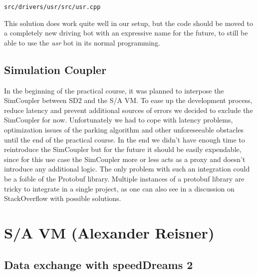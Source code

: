 \documentclass[paper=a4, fontsize=11pt]{scrreprt}
\begin{document}
\begin{listing}[ht]
  \inputminted[firstline=751,linenos=true,lastline=755,gobble=4]{c++}{../../../simulators/speed-dreams/src/drivers/usr/src/usr.cpp}
  \caption{\texttt{src/drivers/usr/src/usr.cpp}}\label{aw_parked}
\end{listing}

This solution does work quite well in our setup,
but the code should be moved to a completely new driving bot with an expressive name for the future,
to still be able to use the \textit{usr} bot in its normal programming.

\section{Simulation Coupler}
In the beginning of the practical course,
it was planned to interpose the SimCoupler between SD2 and the S/A VM.
To ease up the development process, reduce latency and
prevent additional sources of errors we decided to exclude the SimCoupler for now.
Unfortunately we had to cope with latency problems,
optimization issues of the parking algorithm and other unforeseeable obstacles until the end of the practical course.
In the end we didn't have enough time to reintroduce the SimCoupler
but for the future it should be easily expendable,
since for this use case the SimCoupler more or less acts as a proxy
and doesn't introduce any additional logic.
The only problem with such an integration could be a foible of the Protobuf library.
Multiple instances of a protobuf library are tricky to integrate in a single project,
as one can also see in a discussion on StackOverflow \cite{soprotobuf} with possible solutions.

\chapter{S/A VM (Alexander Reisner)}
\section{Data exchange with speedDreams 2}
\end{document}
